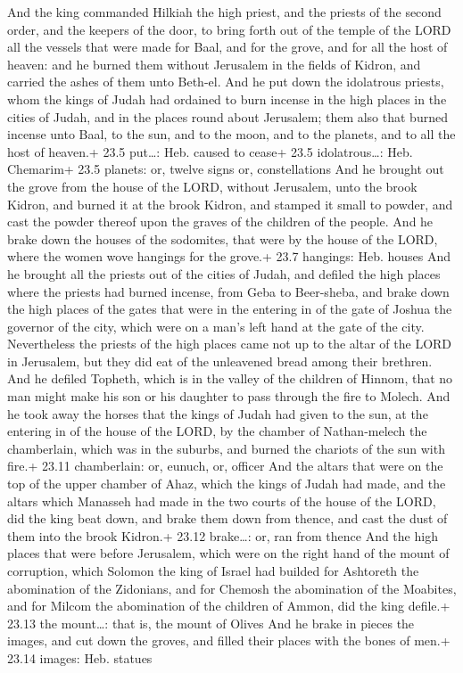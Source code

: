  And the king commanded Hilkiah the high priest, and the
priests of the second order, and the keepers of the door, to bring forth
out of the temple of the LORD all the vessels that were made for Baal,
and for the grove, and for all the host of heaven: and he burned them
without Jerusalem in the fields of Kidron, and carried the ashes of them
unto Beth-el.  And he put down the idolatrous priests, whom
the kings of Judah had ordained to burn incense in the high places in
the cities of Judah, and in the places round about Jerusalem; them also
that burned incense unto Baal, to the sun, and to the moon, and to the
planets, and to all the host of heaven.+ 23.5 put\ldots: Heb. caused to
cease+ 23.5 idolatrous\ldots: Heb. Chemarim+ 23.5 planets: or, twelve
signs or, constellations  And he brought out the grove from
the house of the LORD, without Jerusalem, unto the brook Kidron, and
burned it at the brook Kidron, and stamped it small to powder, and cast
the powder thereof upon the graves of the children of the people.
 And he brake down the houses of the sodomites, that were by
the house of the LORD, where the women wove hangings for the grove.+
23.7 hangings: Heb. houses  And he brought all the priests
out of the cities of Judah, and defiled the high places where the
priests had burned incense, from Geba to Beer-sheba, and brake down the
high places of the gates that were in the entering in of the gate of
Joshua the governor of the city, which were on a man's left hand at the
gate of the city.  Nevertheless the priests of the high
places came not up to the altar of the LORD in Jerusalem, but they did
eat of the unleavened bread among their brethren.  And he
defiled Topheth, which is in the valley of the children of Hinnom, that
no man might make his son or his daughter to pass through the fire to
Molech.  And he took away the horses that the kings of
Judah had given to the sun, at the entering in of the house of the LORD,
by the chamber of Nathan-melech the chamberlain, which was in the
suburbs, and burned the chariots of the sun with fire.+ 23.11
chamberlain: or, eunuch, or, officer  And the altars that
were on the top of the upper chamber of Ahaz, which the kings of Judah
had made, and the altars which Manasseh had made in the two courts of
the house of the LORD, did the king beat down, and brake them down from
thence, and cast the dust of them into the brook Kidron.+ 23.12
brake\ldots: or, ran from thence  And the high places that
were before Jerusalem, which were on the right hand of the mount of
corruption, which Solomon the king of Israel had builded for Ashtoreth
the abomination of the Zidonians, and for Chemosh the abomination of the
Moabites, and for Milcom the abomination of the children of Ammon, did
the king defile.+ 23.13 the mount\ldots: that is, the mount of Olives
 And he brake in pieces the images, and cut down the
groves, and filled their places with the bones of men.+ 23.14 images:
Heb. statues

